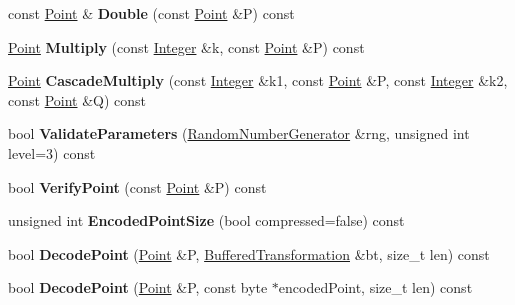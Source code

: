 \begin{DoxyCompactItemize}
\item 
\hypertarget{class_e_c2_n_a89f64e58248c63039c737d753944efac}{
const \hyperlink{struct_e_c2_n_point}{Point} \& {\bfseries Double} (const \hyperlink{struct_e_c2_n_point}{Point} \&P) const }
\label{class_e_c2_n_a89f64e58248c63039c737d753944efac}

\item 
\hypertarget{class_e_c2_n_ad6cc24daebd5880eaabc551be521dc56}{
\hyperlink{struct_e_c2_n_point}{Point} {\bfseries Multiply} (const \hyperlink{class_integer}{Integer} \&k, const \hyperlink{struct_e_c2_n_point}{Point} \&P) const }
\label{class_e_c2_n_ad6cc24daebd5880eaabc551be521dc56}

\item 
\hypertarget{class_e_c2_n_aa95e067cc447d666ceb7060f302ad1d0}{
\hyperlink{struct_e_c2_n_point}{Point} {\bfseries CascadeMultiply} (const \hyperlink{class_integer}{Integer} \&k1, const \hyperlink{struct_e_c2_n_point}{Point} \&P, const \hyperlink{class_integer}{Integer} \&k2, const \hyperlink{struct_e_c2_n_point}{Point} \&Q) const }
\label{class_e_c2_n_aa95e067cc447d666ceb7060f302ad1d0}

\item 
\hypertarget{class_e_c2_n_aedae457b9e8db0d373b381c71fa862d5}{
bool {\bfseries ValidateParameters} (\hyperlink{class_random_number_generator}{RandomNumberGenerator} \&rng, unsigned int level=3) const }
\label{class_e_c2_n_aedae457b9e8db0d373b381c71fa862d5}

\item 
\hypertarget{class_e_c2_n_ac7f4e62771770ea02251d2c327c53ba1}{
bool {\bfseries VerifyPoint} (const \hyperlink{struct_e_c2_n_point}{Point} \&P) const }
\label{class_e_c2_n_ac7f4e62771770ea02251d2c327c53ba1}

\item 
\hypertarget{class_e_c2_n_ac96cb02c86e4568d304cacc0b40783b3}{
unsigned int {\bfseries EncodedPointSize} (bool compressed=false) const }
\label{class_e_c2_n_ac96cb02c86e4568d304cacc0b40783b3}

\item 
\hypertarget{class_e_c2_n_ae9fead90e9048d454916868ef4e55cb6}{
bool {\bfseries DecodePoint} (\hyperlink{struct_e_c2_n_point}{Point} \&P, \hyperlink{class_buffered_transformation}{BufferedTransformation} \&bt, size\_\-t len) const }
\label{class_e_c2_n_ae9fead90e9048d454916868ef4e55cb6}

\item 
\hypertarget{class_e_c2_n_a6148bd875dce5a3d30ea4a2eb4b435e1}{
bool {\bfseries DecodePoint} (\hyperlink{struct_e_c2_n_point}{Point} \&P, const byte $\ast$encodedPoint, size\_\-t len) const }
\label{class_e_c2_n_a6148bd875dce5a3d30ea4a2eb4b435e1}


\end{DoxyCompactItemize}
